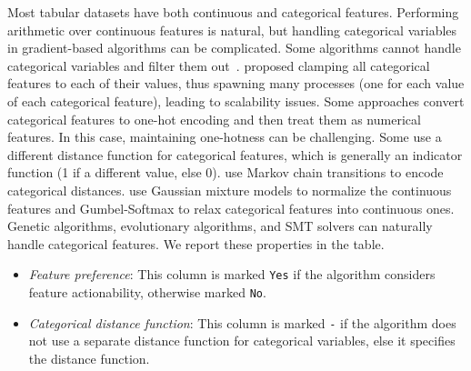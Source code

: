 \begin{enumerate}[leftmargin=*]
    Most tabular datasets have both continuous and categorical features. Performing arithmetic over continuous features is natural, but handling categorical variables in gradient-based algorithms can be complicated. 
    Some algorithms cannot handle categorical variables and filter them out~\citep{medina_comparison-based_2018,lucic-actionable:2020}. 
    \citet{wachter_counterfactual_2017} proposed clamping all categorical features to each of their values, thus spawning many processes (one for each value of each categorical feature), leading to scalability issues. 
    Some approaches convert categorical features to one-hot encoding and then treat them as numerical features. In this case, maintaining one-hotness can be challenging. 
    Some use a different distance function for categorical features, which is generally an indicator function (1 if a different value, else 0).  \citep{coherent_CFEs} use Markov chain transitions to encode categorical distances.
    \citet{gan_cfe_amortized} use Gaussian mixture models to normalize the continuous features and Gumbel-Softmax to relax categorical features into continuous ones.
    Genetic algorithms, evolutionary algorithms, and SMT solvers can naturally handle categorical features. 
    We report these properties in the table. 
    \begin{itemize}%
        \item  \emph{Feature preference}: This column is marked \texttt{Yes} if the algorithm considers feature actionability, otherwise marked \texttt{No}. 
        \item  \emph{Categorical distance function}: This column is marked \texttt{-} if the algorithm does not use a separate distance function for categorical variables, else it specifies the distance function. 
    \end{itemize}

\end{enumerate}



